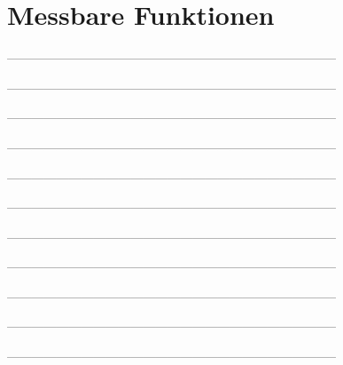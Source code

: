 \setcounter{exercise}{0}

\section{Messbare Funktionen}

--------------------------------------------------------------------------------



--------------------------------------------------------------------------------



--------------------------------------------------------------------------------



--------------------------------------------------------------------------------



--------------------------------------------------------------------------------



--------------------------------------------------------------------------------



--------------------------------------------------------------------------------



--------------------------------------------------------------------------------



--------------------------------------------------------------------------------



--------------------------------------------------------------------------------



--------------------------------------------------------------------------------
